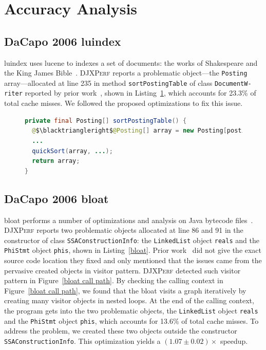 \documentclass[sigconf,10pt,review,anonymous]{acmart}\settopmatter{printfolios=true,printccs=false,printacmref=false}
\newcommand{\tool}[0]{\mbox{\textsc{DJXPerf}}}
\begin{document}
\section{Accuracy Analysis}
\subsection{DaCapo 2006 luindex}
luindex uses lucene to indexes a set of documents: the works of Shakespeare and the King James Bible~\cite{dacapo}. \tool{} reports a problematic object---the {\tt Posting} array---allocated at line 235 in method {\tt sortPostingTable} of class {\tt DocumentW-\\riter} reported by prior work~\cite{Reusable}, shown in Listing~\ref{luindex}, which accounts for 23.3\% of total cache misses. We followed the proposed optimizations to fix this issue.

\begin{figure}
\begin{lstlisting}[firstnumber=234,language=java]
private final Posting[] sortPostingTable() {
  @$\blacktriangleright$@Posting[] array = new Posting[postingTable.size()];
  ...
  quickSort(array, ...);
  return array;
}
\end{lstlisting}
\vspace{-0.3in}
\label{luindex}
\end{figure}

\subsection{DaCapo 2006 bloat}
bloat performs a number of optimizations and analysis on Java bytecode files~\cite{dacapo}. \tool{} reports two problematic objects allocated at line 86 and 91 in the constructor of class {\tt SSAConstructionInfo}: the {\tt LinkedList} object {\tt reals} and the {\tt PhiStmt} object {\tt phis}, shown in Listing~\ref{bloat}. Prior work~\cite{Reusable} did not give the exact source code location they fixed and only mentioned that the issues came from the pervasive created objects in visitor pattern. \tool{} detected such visitor pattern in Figure~\ref{bloat call path}. By checking the calling context in Figure~\ref{bloat call path}, we found that the bloat visits a graph iteratively by creating many visitor objects in nested loops. At the end of the calling context, the program gets into the two problematic objects,  the {\tt LinkedList} object {\tt reals} and the {\tt PhiStmt} object {\tt phis}, which accounts for 13.6\% of total cache misses. To address the problem, we created these two objects outside the constructor {\tt SSAConstructionInfo}. This optimization yields a $(1.07\pm0.02)\times$ speedup.
\end{document}
